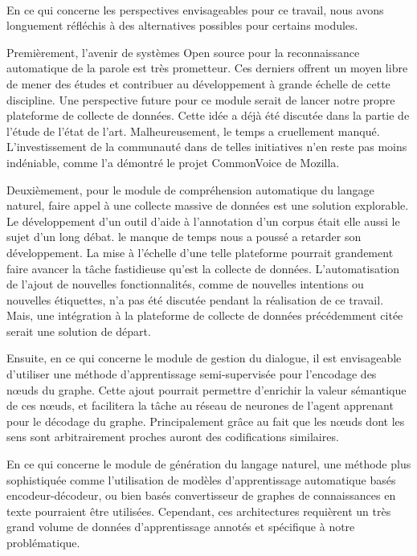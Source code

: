 \paragraph{}
En ce qui concerne les perspectives envisageables pour ce travail, nous avons longuement réfléchis à des alternatives possibles pour certains modules.
\par
Premièrement, l'avenir de systèmes Open source pour la reconnaissance automatique de la parole est très prometteur. Ces derniers offrent un moyen libre de mener des études et contribuer au développement à grande échelle de cette discipline. Une perspective future pour ce module serait de lancer notre propre plateforme de collecte de données. Cette idée a déjà été discutée dans la partie de l'étude de l'état de l'art. Malheureusement, le temps a cruellement manqué. L'investissement de la communauté dans de telles initiatives n'en reste pas moins indéniable, comme l'a démontré le projet CommonVoice de Mozilla.
\par
Deuxièmement, pour le module de compréhension automatique du langage naturel, faire appel à une collecte massive de données est une solution explorable. Le développement d'un outil d'aide à l'annotation d'un corpus était elle aussi le sujet d'un long débat. le manque de temps nous a poussé a retarder son développement. La mise à l'échelle d'une telle plateforme pourrait grandement faire avancer la tâche fastidieuse qu'est la collecte de données. 
L'automatisation de l'ajout de nouvelles fonctionnalités, comme de nouvelles intentions ou nouvelles étiquettes, n'a pas été discutée pendant la réalisation de ce travail. Mais, une intégration à la plateforme de collecte de données précédemment citée serait une solution de départ.
\par 

Ensuite, en ce qui concerne le module de gestion du dialogue, il est envisageable d'utiliser une méthode d'apprentissage semi-supervisée pour l'encodage des n\oe{}uds du graphe. Cette ajout pourrait permettre d'enrichir la valeur sémantique de ces n\oe{}uds, et facilitera la tâche au réseau de neurones de l'agent apprenant pour le décodage du graphe. Principalement grâce au fait que les n\oe{}uds dont les sens sont arbitrairement proches auront des codifications similaires.

\par
En ce qui concerne le module de génération du langage naturel, une méthode plus sophistiquée comme l'utilisation de modèles d'apprentissage automatique basés encodeur-décodeur, ou bien basés convertisseur de graphes de connaissances en texte pourraient être utilisées. Cependant, ces architectures requièrent un très grand volume de données d'apprentissage annotés et spécifique à notre problématique.

